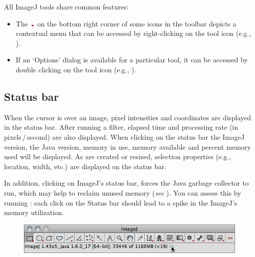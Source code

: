 All ImageJ tools share common features:
\begin{itemize}
\item The\ \includegraphics{images/tools/triangle}\  on the bottom right
corner of some icons in the toolbar depicts a contextual menu that
can be accessed by right-clicking on the tool icon (e.g., ).
\item If an `Options' dialog is available for a particular tool, it can
be accessed by double clicking on the tool icon (e.g., ).
\end{itemize}

\subsection*{Status bar\label{sub:Status-bar}}

When the cursor is over an image, pixel intensities and coordinates
are displayed in the status bar. After running
a filter, elapsed time and processing rate (in pixels\,/\,second)
are also displayed. When clicking on the status bar the ImageJ version,
the Java version, memory
in use, memory available and percent memory used will be displayed.
As  are created or resized, selection
properties (e.g., location, width, etc.) are displayed on the status
bar.

\noindent In addition, clicking on ImageJ's status bar, forces the
Java garbage collector to run, which may help to reclaim unused memory
(\emph{see}\textsf{ }).
You can assess this by running \textsf{}:
each click on the Status bar should lead to a spike in the ImageJ's
memory utilization. 
\begin{figure}[H]
\noindent \centering{}\includegraphics[scale=0.55]{images/StatusBar}
\end{figure}



